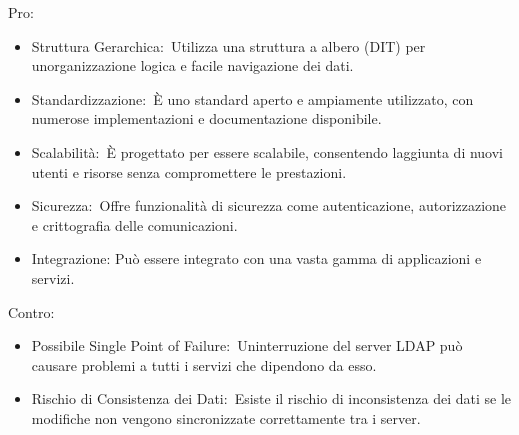 \documentclass[
]{article}
\providecommand{\tightlist}{%
  \setlength{\itemsep}{0pt}\setlength{\parskip}{0pt}}
\begin{document}
{}

{Pro}{: }

\begin{itemize}
\tightlist
\item
  {Struttura Gerarchica:}{~Utilizza una struttura a albero (DIT) per
  un\textquotesingle organizzazione logica e facile navigazione dei
  dati. }
\end{itemize}

{}

\begin{itemize}
\tightlist
\item
  {Standardizzazione:}{~È uno standard aperto e ampiamente utilizzato,
  con numerose implementazioni e documentazione disponibile. }
\end{itemize}

{}

\begin{itemize}
\tightlist
\item
  {Scalabilità:}{~È progettato per essere scalabile, consentendo
  l\textquotesingle aggiunta di nuovi utenti e risorse senza
  compromettere le prestazioni. }
\end{itemize}

{}

\begin{itemize}
\tightlist
\item
  {Sicurezza:}{~Offre funzionalità di sicurezza come autenticazione,
  autorizzazione e crittografia delle comunicazioni. }
\end{itemize}

{}

\begin{itemize}
\tightlist
\item
  {Integrazione: }{Può essere integrato con una vasta gamma di
  applicazioni e servizi. }
\end{itemize}

{}

{Contro}{: }

\begin{itemize}
\tightlist
\item
  {Possibile Single Point of Failure:}{~Un\textquotesingle interruzione
  del server LDAP può causare problemi a tutti i servizi che dipendono
  da esso. }
\end{itemize}

{}

\begin{itemize}
\tightlist
\item
  {Rischio di Consistenza dei Dati:}{~Esiste il rischio di inconsistenza
  dei dati se le modifiche non vengono sincronizzate correttamente tra i
  server.}
\end{itemize}
\end{document}
